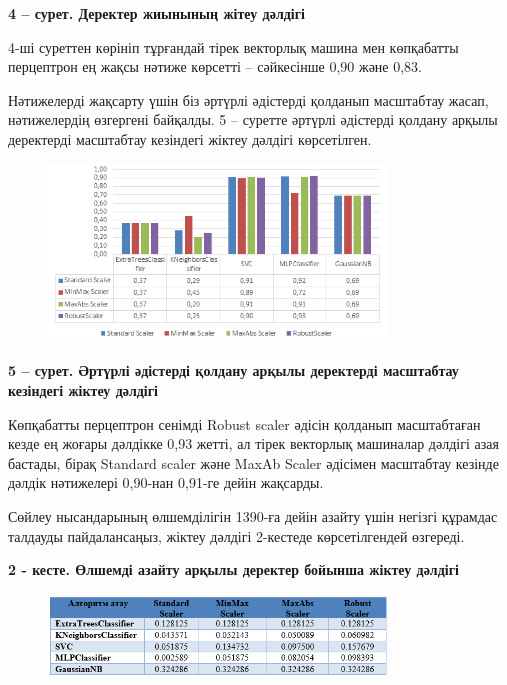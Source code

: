 {\bfseries 4 -- сурет. Деректер жиынының жітеу дәлдігі}

4-ші суреттен көрініп тұрғандай тірек векторлық машина мен көпқабатты
перцептрон ең жақсы нәтиже көрсетті -- сәйкесінше 0,90 және 0,83.

Нәтижелерді жақсарту үшін біз әртүрлі әдістерді қолданып масштабтау
жасап, нәтижелердің өзгергені байқалды. 5 -- суретте әртүрлі әдістерді
қолдану арқылы деректерді масштабтау кезіндегі жіктеу дәлдігі
көрсетілген.

\begin{figure}[H]
	\centering
	\includegraphics[width=0.8\textwidth]{media/ict/image9}
	\caption*{}
\end{figure}


{\bfseries 5 -- сурет. Әртүрлі әдістерді қолдану арқылы деректерді
масштабтау кезіндегі жіктеу дәлдігі}

Көпқабатты перцептрон сенімді Robust scaler әдісін қолданып масштабтаған
кезде ең жоғары дәлдікке 0,93 жетті, ал тірек векторлық машиналар
дәлдігі азая бастады, бірақ Standard scaler және MaxAb Scaler әдісімен
масштабтау кезінде дәлдік нәтижелері 0,90-нан 0,91-ге дейін жақсарды.

Сөйлеу нысандарының өлшемділігін 1390-ға дейін азайту үшін негізгі
құрамдас талдауды пайдалансаңыз, жіктеу дәлдігі 2-кестеде көрсетілгендей
өзгереді.

{\bfseries 2 - кесте. Өлшемді азайту арқылы деректер бойынша жіктеу
дәлдігі}

\begin{figure}[H]
	\centering
	\includegraphics[width=0.8\textwidth]{media/ict/image10}
	\caption*{}
\end{figure}


